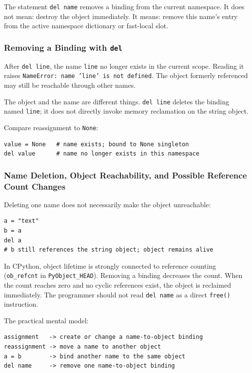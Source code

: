\documentclass[a4paper,twoside]{report}
\begin{document}
The statement \texttt{del name} removes a binding from the current namespace. It does not mean: destroy the object immediately. It means: remove this name's entry from the active namespace dictionary or fast-local slot.

\subsubsection{Removing a Binding with \texttt{del}}

After \texttt{del line}, the name \texttt{line} no longer exists in the current scope. Reading it raises \texttt{NameError: name 'line' is not defined}. The object formerly referenced may still be reachable through other names.

The object and the name are different things. \texttt{del line} deletes the binding named \texttt{line}; it does not directly invoke memory reclamation on the string object.

Compare reassignment to \texttt{None}:

\begin{verbatim}
value = None   # name exists; bound to None singleton
del value      # name no longer exists in this namespace
\end{verbatim}

\subsubsection{Name Deletion, Object Reachability, and Possible Reference Count Changes}

Deleting one name does not necessarily make the object unreachable:

\begin{verbatim}
a = "text"
b = a
del a
# b still references the string object; object remains alive
\end{verbatim}

In CPython, object lifetime is strongly connected to reference counting (\texttt{ob\_refcnt} in \texttt{PyObject\_HEAD}). Removing a binding decreases the count. When the count reaches zero and no cyclic references exist, the object is reclaimed immediately. The programmer should not read \texttt{del name} as a direct \texttt{free()} instruction.

The practical mental model:

\begin{verbatim}
assignment   -> create or change a name-to-object binding
reassignment -> move a name to another object
a = b        -> bind another name to the same object
del name     -> remove one name-to-object binding
\end{verbatim}
\end{document}
